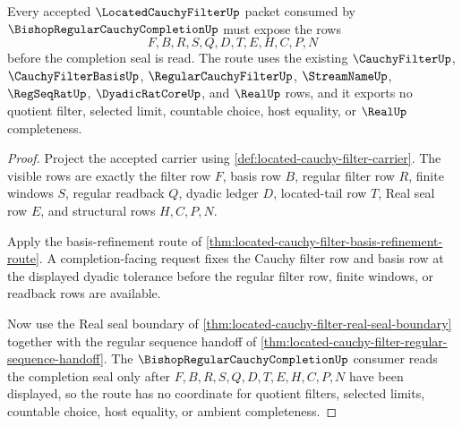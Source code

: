 \begin{theorem}
\label{thm:located-cauchy-filter-bishop-completion-handoff}
Every accepted $\LocatedCauchyFilterUp$ packet consumed by $\BishopRegularCauchyCompletionUp$ must expose the rows
$$
F,B,R,S,Q,D,T,E,H,C,P,N
$$
before the completion seal is read. The route uses the existing $\CauchyFilterUp$, $\CauchyFilterBasisUp$, $\RegularCauchyFilterUp$, $\StreamNameUp$, $\RegSeqRatUp$, $\DyadicRatCoreUp$, and $\RealUp$ rows, and it exports no quotient filter, selected limit, countable choice, host equality, or $\RealUp$ completeness.
\end{theorem}
\begin{proof}
Project the accepted carrier using \autoref{def:located-cauchy-filter-carrier}. The visible rows are exactly the filter row $F$, basis row $B$, regular filter row $R$, finite windows $S$, regular readback $Q$, dyadic ledger $D$, located-tail row $T$, Real seal row $E$, and structural rows $H,C,P,N$.

Apply the basis-refinement route of \autoref{thm:located-cauchy-filter-basis-refinement-route}. A completion-facing request fixes the Cauchy filter row and basis row at the displayed dyadic tolerance before the regular filter row, finite windows, or readback rows are available.

Now use the Real seal boundary of \autoref{thm:located-cauchy-filter-real-seal-boundary} together with the regular sequence handoff of \autoref{thm:located-cauchy-filter-regular-sequence-handoff}. The $\BishopRegularCauchyCompletionUp$ consumer reads the completion seal only after $F,B,R,S,Q,D,T,E,H,C,P,N$ have been displayed, so the route has no coordinate for quotient filters, selected limits, countable choice, host equality, or ambient completeness.
\end{proof}

